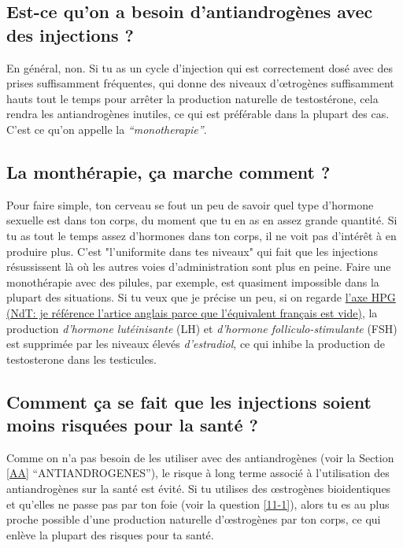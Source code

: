 \documentclass{article}
\begin{document}
\subsection{Est-ce qu'on a besoin d'antiandrogènes avec des injections ?}

En général, non. Si tu as un cycle d'injection qui est correctement dosé avec des prises suffisamment fréquentes, qui donne des niveaux d'œtrogènes suffisamment hauts tout le temps pour arrêter la production naturelle de testostérone, cela rendra les antiandrogènes inutiles, ce qui est préférable dans la plupart des cas. C'est ce qu'on appelle la \textit{“monotherapie”}.

\subsection{La monthérapie, ça marche comment ?}\label{2-3}

Pour faire simple, ton cerveau se fout un peu de savoir quel type d'hormone sexuelle est dans ton corps, du moment que tu en as en assez grande quantité. Si tu as tout le temps assez d'hormones dans ton corps, il ne voit pas d'intérêt à en produire plus. C'est "l'uniformite dans tes niveaux" qui fait que les injections résussissent là où les autres voies d'administration sont plus en peine. Faire une monothérapie avec des pilules, par exemple, est quasiment impossible dans la plupart des situations. Si tu veux que je précise un peu, si on regarde \href{https://en.wikipedia.org/wiki/Hypothalamic-pituitary-gonadal_axis}{l'axe HPG (NdT: je référence l'artice anglais parce que l'équivalent français est vide)}, la production \textit{d'hormone lutéinisante} (LH) et \textit{d'hormone folliculo-stimulante} (FSH) est supprimée par les niveaux élevés \textit{d'estradiol}, ce qui inhibe la production de testosterone dans les testicules.

\subsection{Comment ça se fait que les injections soient moins risquées pour la santé ?}

Comme on n'a pas besoin de les utiliser avec des antiandrogènes (voir la Section \ref{AA} “ANTIANDROGENES”), le risque à long terme associé à l'utilisation des antiandrogènes sur la santé est évité. Si tu utilises des œstrogènes bioidentiques et qu'elles ne passe pas par ton foie (voir la question \ref{11-1}), alors tu es au plus proche possible d'une production naturelle d'œstrogènes par ton corps, ce qui enlève la plupart des risques pour ta santé.
\end{document}
